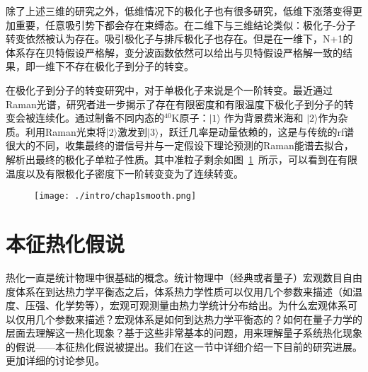 除了上述三维的研究之外，低维情况下的极化子也有很多研究，低维下涨落变得更加重要，任意吸引势下都会存在束缚态。在二维下与三维结论类似：极化子-分子转变依然被认为存在\cite{Zollner2011Polarons,Parish2011pm,Lewenstein2013spinchain012High}。吸引极化子与排斥极化子也存在\cite{Schmidt2012fermi,Ngampruetikorn_2012}。但是在一维下，N+1的体系存在贝特假设严格解\cite{mcguire1965interacting,mcguire1966interacting}，变分波函数依然可以给出与贝特假设严格解一致的结果，即一维下不存在极化子到分子的转变\cite{Giraud2009highly,Leskinen_2010,Astrakharchik2013trapped}。

在极化子到分子的转变研究中，对于单极化子来说是个一阶转变。最近通过Raman光谱，研究者进一步揭示了存在有限密度和有限温度下极化子到分子的转变会被连续化\cite{Sagi2020}。通过制备不同内态的${}^{40}$K原子：$|1\rangle$ 作为背景费米海和 $|2\rangle$作为杂质。利用Raman光束将$|2\rangle$激发到$|3\rangle$，跃迁几率是动量依赖的，这是与传统的rf谱很大的不同，收集最终的谱信号并与一定假设下理论预测的Raman能谱去拟合，解析出最终的极化子单粒子性质。其中准粒子剩余如图~\ref{fpsmooth}~所示，可以看到在有限温度以及有限极化子密度下一阶转变变为了连续转变。
\begin{figure}[!htbp]
    \centering
    \texttt{[image: ./intro/chap1smooth.png]}
    \label{fpsmooth}
\end{figure}




\section{本征热化假说}\label{1sec:ETH}
热化一直是统计物理中很基础的概念。统计物理中（经典或者量子）宏观数目自由度体系在到达热力学平衡态之后，体系热力学性质可以仅用几个参数来描述（如温度、压强、化学势等），宏观可观测量由热力学统计分布给出。为什么宏观体系可以仅用几个参数来描述？宏观体系是如何到达热力学平衡态的？如何在量子力学的层面去理解这一热化现象？基于这些非常基本的问题，用来理解量子系统热化现象的假说——本征热化假说被提出。我们在这一节中详细介绍一下目前的研究进展。更加详细的讨论参见\cite{d2016quantum,deutsch2018eigenstate}。

